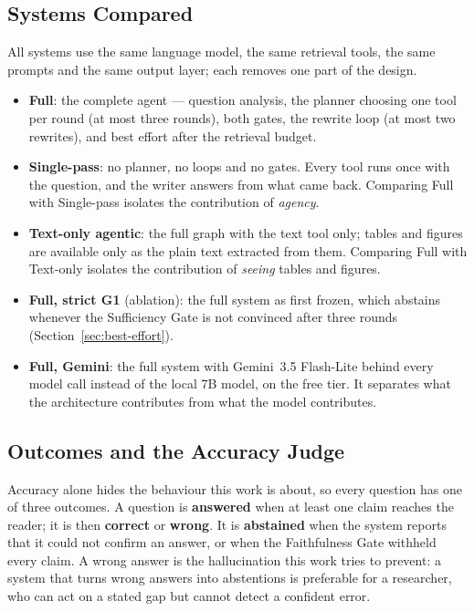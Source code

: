 \subsection{Systems Compared}

All systems use the same language model, the same retrieval tools, the same prompts
and the same output layer; each removes one part of the design.

\begin{itemize}
    \item \textbf{Full}: the complete agent --- question analysis, the planner choosing
    one tool per round (at most three rounds), both gates, the rewrite loop (at most two
    rewrites), and best effort after the retrieval budget.
    \item \textbf{Single-pass}: no planner, no loops and no gates. Every tool runs once
    with the question, and the writer answers from what came back. Comparing Full with
    Single-pass isolates the contribution of \emph{agency}.
    \item \textbf{Text-only agentic}: the full graph with the text tool only; tables and
    figures are available only as the plain text extracted from them. Comparing Full
    with Text-only isolates the contribution of \emph{seeing} tables and figures.
    \item \textbf{Full, strict G1} (ablation): the full system as first frozen, which
    abstains whenever the Sufficiency Gate is not convinced after three rounds
    (Section~\ref{sec:best-effort}).
    \item \textbf{Full, Gemini}: the full system with Gemini~3.5 Flash-Lite behind every
    model call instead of the local 7B model, on the free tier. It separates what the
    architecture contributes from what the model contributes.
\end{itemize}

\subsection{Outcomes and the Accuracy Judge}
\label{sec:judge}

Accuracy alone hides the behaviour this work is about, so every question has one of
three outcomes. A question is \textbf{answered} when at least one claim reaches the
reader; it is then \textbf{correct} or \textbf{wrong}. It is \textbf{abstained} when
the system reports that it could not confirm an answer, or when the Faithfulness Gate
withheld every claim. A wrong answer is the hallucination this work tries to prevent:
a system that turns wrong answers into abstentions is preferable for a researcher,
who can act on a stated gap but cannot detect a confident error.

